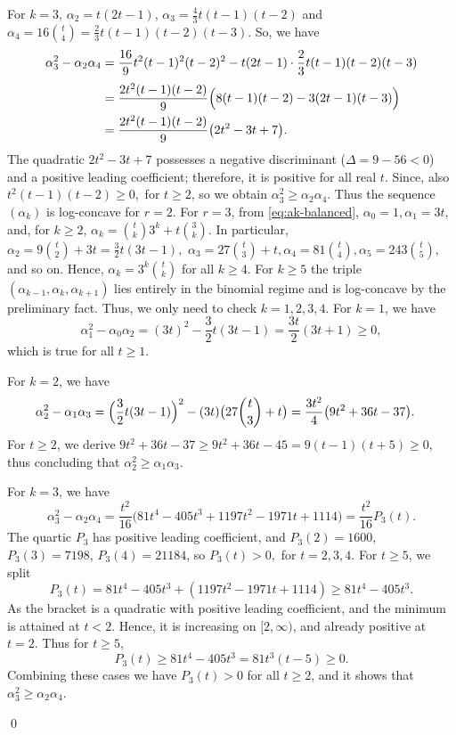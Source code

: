 \documentclass[12pt,twoside]{article}
\renewenvironment{proof}{{\noindent\bfseries Proof.}}{\qed}
\begin{document}
\begin{proof}
		For $k=3$,  $\alpha_2=t(2t-1)$, $\alpha_3=\tfrac{4}{3}t(t-1)(t-2)$ and $\alpha_4 = 16\binom{t}{4} = \tfrac{2}{3}t(t-1)(t-2)(t-3)$. So, we have
		\begin{align*}
			\alpha_3^2 - \alpha_2\alpha_4
			&= \frac{16}{9}t^2(t-1)^2(t-2)^2
			- t(2t-1)\cdot \frac{2}{3}t(t-1)(t-2)(t-3)\\[1mm]
			&= \frac{2t^2(t-1)(t-2)}{9}\Bigl(8(t-1)(t-2) - 3(2t-1)(t-3)\Bigr)\\
			&= \frac{2t^2(t-1)(t-2)}{9}\bigl(2t^2 - 3t + 7\bigr).
		\end{align*}
		The quadratic \(2t^2 - 3t + 7\) possesses a negative discriminant (\(\Delta = 9 - 56 < 0\)) and a positive leading coefficient; therefore, it is positive for all real \(t\).  Since, also $t^2(t-1)(t-2)\ge 0,$ for $t\ge 2$, so we obtain
		$\alpha_3^2\ge \alpha_2\alpha_4$. Thus the sequence $(\alpha_k)$ is log-concave for $r=2$.
		 For $r=3$, from \eqref{eq:ak-balanced}, $\alpha_0=1, \alpha_1=3t,$ and, for $k\ge 2$, $\alpha_k = \binom{t}{k}3^k + t\binom{3}{k}. $ In particular, $\alpha_2 = 9\binom{t}{2} + 3t= \frac{3}{2}t(3t-1), $
		$\alpha_3 = 27\binom{t}{3} + t,	\alpha_4 = 81\binom{t}{4},	\alpha_5 = 243\binom{t}{5},$ and so on.
		Hence,  $\alpha_k = 3^k\binom{t}{k}$ for all $k\ge 4$. For $k\ge 5$ the triple $(\alpha_{k-1},\alpha_k,\alpha_{k+1})$ lies entirely in the binomial
		regime and is log-concave by the preliminary fact. Thus, we only need to check $k=1,2,3,4$. For $k=1$, we have
		\[
		\alpha_1^2 - \alpha_0\alpha_2
		= (3t)^2 - \frac{3}{2}t(3t-1)
		= \frac{3t}{2}(3t+1)  \ge  0,
		\]
		which is true for all $t\ge 1$.
		
		For $k=2$,  we have
		\begin{align*}
			\alpha_2^2 - \alpha_1\alpha_3
			&= \Bigl(\frac{3}{2}t(3t-1)\Bigr)^2
			- (3t)\bigl(27\binom{t}{3}+t\bigr)= \frac{3t^2}{4}\bigl(9t^2+36t-37\bigr).
		\end{align*}
		For \( t \ge 2 \), we derive \( 9t^2 + 36t - 37 \ge 9t^2 + 36t - 45 = 9(t - 1)(t + 5) \ge 0 \), thus concluding that \( \alpha_2^2 \ge \alpha_1 \alpha_3 \).
		
		For $k=3$, we have
		\[
		\alpha_3^2 - \alpha_2\alpha_4
		= \frac{t^2}{16}\bigl(81t^4 -405t^3 +1197t^2 -1971t +1114\bigr)
		= \frac{t^2}{16}P_3(t).
		\]
		The quartic $P_3$ has positive leading coefficient, and 
		$P_3(2)=1600$, $P_3(3)=7198$, $P_3(4)=21184$, so $P_3(t)>0,$ for
		$t=2,3,4$. For $t\ge 5$, we split
		\[
		P_3(t) = 81t^4 -405t^3 + (1197t^2 -1971t +1114)
		\ge 81t^4 -405t^3.
		\]
		As the bracket is a quadratic with positive leading coefficient, and the
		minimum is attained at $t<2$. Hence, it is increasing on $[2,\infty)$, and already
		positive at $t=2$. Thus for $t\ge 5$,
		\[
		P_3(t) \ge 81t^4 -405t^3 = 81t^3(t-5)\ge 0.
		\]
		Combining these cases we have $P_3(t)>0$ for all $t\ge 2$, and it shows that 
		$\alpha_3^2\ge \alpha_2\alpha_4$.
		

\end{proof}
\end{document}

